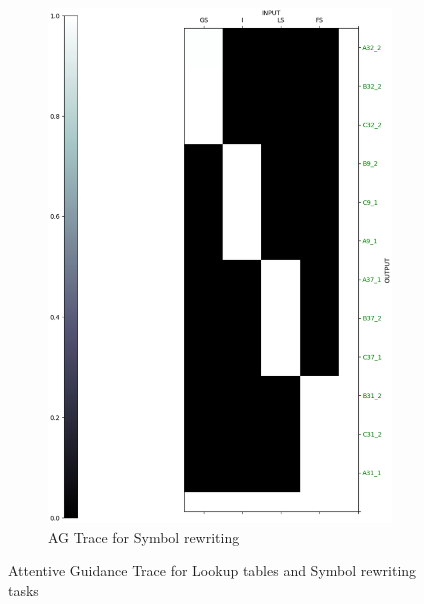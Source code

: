 \begin{figure}[ht]
\begin{subfigure}[b]{0.5\linewidth}
		\includegraphics[width=0.95\linewidth]{./figs/lookup/sr-trace-eps}
		\fi 
		\caption{AG Trace for Symbol rewriting} 
		\label{ag_sr} 
		\vspace{2ex}
	\end{subfigure}
	\caption{Attentive Guidance Trace for Lookup tables and Symbol rewriting tasks}
	\label{lt_sr_trace}
\end{figure}